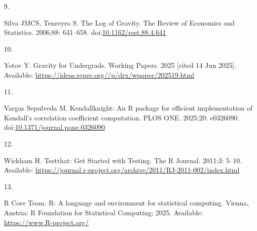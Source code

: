 \documentclass[
  10pt,
  letterpaper,
]{article}
\newlength{\cslhangindent}
\newlength{\csllabelwidth}
\newenvironment{CSLReferences}[2] %
 {\begin{list}{}{%
  \setlength{\itemindent}{0pt}
  \setlength{\leftmargin}{0pt}
  \setlength{\parsep}{0pt}
  \ifodd #1
   \setlength{\leftmargin}{\cslhangindent}
   \setlength{\itemindent}{-1\cslhangindent}
  \fi
  \setlength{\itemsep}{#2\baselineskip}}}
 {\end{list}}
\newcommand{\CSLLeftMargin}[1]{\parbox[t]{\csllabelwidth}{\strut#1\strut}}
\newcommand{\CSLRightInline}[1]{\parbox[t]{\linewidth - \csllabelwidth}{\strut#1\strut}}
\begin{document}
\begin{CSLReferences}{0}{1}
\CSLLeftMargin{9. }%
\CSLRightInline{Silva JMCS, Tenreyro S. The {Log} of {Gravity}. The
Review of Economics and Statistics. 2006;88: 641--658.
doi:\href{https://doi.org/10.1162/rest.88.4.641}{10.1162/rest.88.4.641}}

\CSLLeftMargin{10. }%
\CSLRightInline{Yotov Y. Gravity for {Undergrads}. Working Papers. 2025
{[}cited 14 Jun 2025{]}. Available:
\url{https://ideas.repec.org//p/drx/wpaper/202519.html}}

\CSLLeftMargin{11. }%
\CSLRightInline{Vargas Sepulveda M. Kendallknight: {An} {R} package for
efficient implementation of {Kendall}'s correlation coefficient
computation. PLOS ONE. 2025;20: e0326090.
doi:\href{https://doi.org/10.1371/journal.pone.0326090}{10.1371/journal.pone.0326090}}

\CSLLeftMargin{12. }%
\CSLRightInline{Wickham H. Testthat: {Get} {Started} with {Testing}. The
R Journal. 2011;3: 5--10. Available:
\url{https://journal.r-project.org/archive/2011/RJ-2011-002/index.html}}

\CSLLeftMargin{13. }%
\CSLRightInline{R Core Team. R: A language and environment for
statistical computing. Vienna, Austria: R Foundation for Statistical
Computing; 2025. Available: \url{https://www.R-project.org/}}

\end{CSLReferences}


\nolinenumbers
\end{document}
